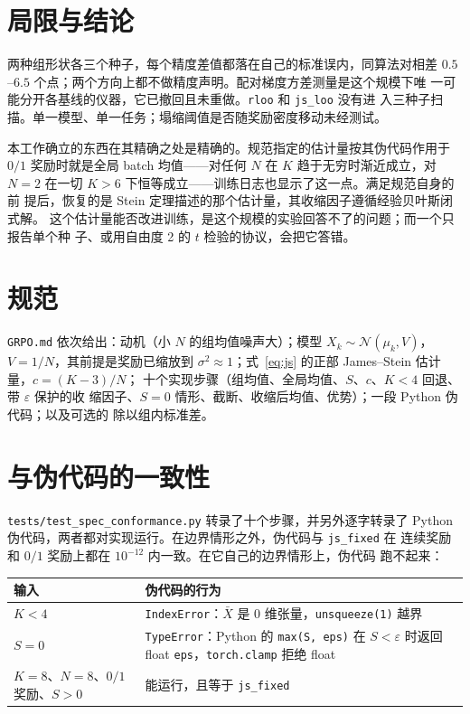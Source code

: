 \documentclass{article}
\newcommand{\arm}[1]{\texttt{#1}}
\begin{document}
\section{局限与结论}

两种组形状各三个种子，每个精度差值都落在自己的标准误内，同算法对相差
$0.5$--$6.5$ 个点；两个方向上都不做精度声明。配对梯度方差测量是这个规模下唯
一可能分开各基线的仪器，它已撤回且未重做。\arm{rloo} 和 \arm{js\_loo} 没有进
入三种子扫描。单一模型、单一任务；塌缩阈值是否随奖励密度移动未经测试。

本工作确立的东西在其精确之处是精确的。规范指定的估计量按其伪代码作用于
$0/1$ 奖励时就是全局 batch 均值——对任何 $N$ 在 $K$ 趋于无穷时渐近成立，对
$N=2$ 在一切 $K>6$ 下恒等成立——训练日志也显示了这一点。满足规范自身的前
提后，恢复的是 Stein 定理描述的那个估计量，其收缩因子遵循经验贝叶斯闭式解。
这个估计量能否改进训练，是这个规模的实验回答不了的问题；而一个只报告单个种
子、或用自由度 2 的 $t$ 检验的协议，会把它答错。




\appendix

\section{规范}
\label{app:spec}

\texttt{GRPO.md} 依次给出：动机（小 $N$ 的组均值噪声大）；模型
$X_k\sim\mathcal N(\mu_k,V)$，$V=1/N$，其前提是奖励已缩放到
$\sigma^2\approx1$；式~\eqref{eq:js} 的正部 James--Stein 估计量，$c=(K-3)/N$；
十个实现步骤（组均值、全局均值、$S$、$c$、$K<4$ 回退、带 $\varepsilon$ 保护的收
缩因子、$S=0$ 情形、截断、收缩后均值、优势）；一段 Python 伪代码；以及可选的
除以组内标准差。

\section{与伪代码的一致性}
\label{app:conformance}

\texttt{tests/test\_spec\_conformance.py} 转录了十个步骤，并另外逐字转录了
Python 伪代码，两者都对实现运行。在边界情形之外，伪代码与 \arm{js\_fixed} 在
连续奖励和 $0/1$ 奖励上都在 $10^{-12}$ 内一致。在它自己的边界情形上，伪代码
跑不起来：

\begin{center}\small
\begin{tabular}{lp{8.6cm}}
\toprule
输入 & 伪代码的行为 \\
\midrule
$K<4$ & \texttt{IndexError}：$\bar X$ 是 0 维张量，\texttt{unsqueeze(1)} 越界 \\
$S=0$ & \texttt{TypeError}：Python 的 \texttt{max(S, eps)} 在 $S<\varepsilon$ 时返回 float \texttt{eps}，\texttt{torch.clamp} 拒绝 float \\
$K=8$、$N=8$、$0/1$ 奖励、$S>0$ & 能运行，且等于 \arm{js\_fixed} \\
\bottomrule
\end{tabular}
\end{center}
\end{document}
